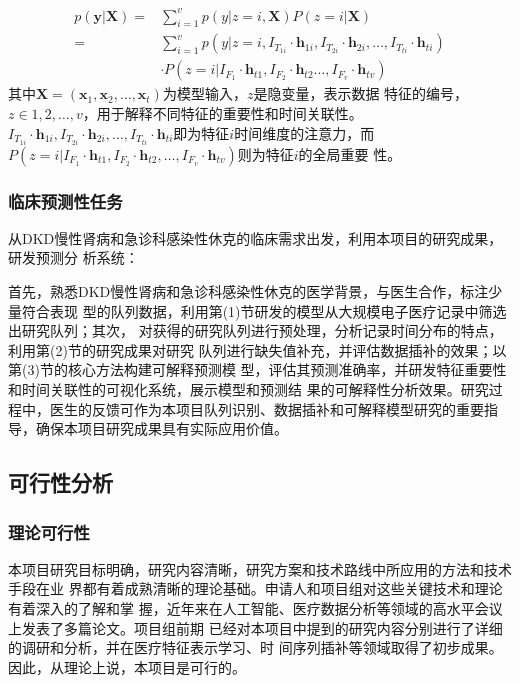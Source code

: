\begin{equation}
    \begin{aligned}
        p(\bm y | \bm X) =& \sum_{i=1}^v p(y|z=i, \bm X) P(z=i | \bm X) \\
            =& \sum_{i=1}^v p(y|z=i, I_{T_{1i}} \cdot \bm h_{1i}, I_{T_{2i}} \cdot \bm h_{2i}, \dots, I_{T_{ti}} \cdot \bm h_{ti}) \\
            & \cdot P(z=i|I_{F_1} \cdot \bm h_{t1}, I_{F_2} \cdot \bm h_{t2} \dots, I_{F_v} \cdot \bm h_{tv})
    \end{aligned}
\end{equation}
其中$\bm X= (\bm x_1, \bm x_2, \dots, \bm x_t)$为模型输入，$z$是隐变量，表示数据
特征的编号，$z \in {1,2,\dots, v}$，用于解释不同特征的重要性和时间关联性。
$I_{T_{1i}} \cdot \bm h_{1i}, I_{T_{2i}} \cdot \bm h_{2i}, \dots, I_{T_{ti}}
\cdot \bm h_{ti}$即为特征$i$时间维度的注意力，而$P(z=i|I_{F_1} \cdot \bm h_{t1},
I_{F_2} \cdot \bm h_{t2}, \dots, I_{F_v} \cdot \bm h_{tv})$则为特征$i$的全局重要
性。

\subsubsection{临床预测性任务}

从DKD慢性肾病和急诊科感染性休克的临床需求出发，利用本项目的研究成果，研发预测分
析系统：

首先，熟悉DKD慢性肾病和急诊科感染性休克的医学背景，与医生合作，标注少量符合表现
型的队列数据，利用第(1)节研发的模型从大规模电子医疗记录中筛选出研究队列；其次，
对获得的研究队列进行预处理，分析记录时间分布的特点，利用第(2)节的研究成果对研究
队列进行缺失值补充，并评估数据插补的效果；以第(3)节的核心方法构建可解释预测模
型，评估其预测准确率，并研发特征重要性和时间关联性的可视化系统，展示模型和预测结
果的可解释性分析效果。研究过程中，医生的反馈可作为本项目队列识别、数据插补和可解释模型研究的重要指导，确保本项目研究成果具有实际应用价值。

\subsection{可行性分析}

\subsubsection{理论可行性}

本项目研究目标明确，研究内容清晰，研究方案和技术路线中所应用的方法和技术手段在业
界都有着成熟清晰的理论基础。申请人和项目组对这些关键技术和理论有着深入的了解和掌
握，近年来在人工智能、医疗数据分析等领域的高水平会议上发表了多篇论文。项目组前期
已经对本项目中提到的研究内容分别进行了详细的调研和分析，并在医疗特征表示学习、时
间序列插补等领域取得了初步成果。因此，从理论上说，本项目是可行的。


